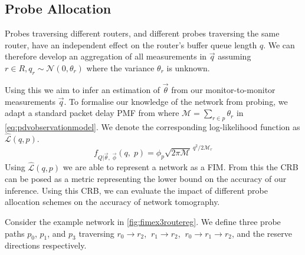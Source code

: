 \subsection{Probe Allocation}
\label{ssec:Mprobeallocation}
Probes traversing different routers, and different probes traversing the same router, have an independent effect on the router's buffer queue length $q$. We can therefore develop an aggregation of all measurements in $\vec{q}$ assuming $r\in R, q_r \sim \mathcal{N}(0, \theta_r)$ where the variance $\theta_r$ is unknown.\par
Using this we aim to infer an estimation of $\vec{\theta}$ from our monitor-to-monitor measurements $\vec{q}$. To formalise our knowledge of the network from probing, we adapt a standard packet delay PMF from \cite{he_network_2021} where $\mathcal{M} = \sum_{r\in p}\theta_r$ in \cref{eq:pdvobservationmodel}. We denote the corresponding log-likelihood function as $\widehat{\mathcal{L}}(q, p)$.
\begin{equation}
\label{eq:pdvobservationmodel}
    f_{Q|\vec{\theta},\; \vec{\phi}}(q,\;p) = \phi_p \sqrt{2\pi\mathcal{M}}^{\ q^2/{2\mathcal{M}_r}}
\end{equation}
Using $\widehat{\mathcal{L}}(q, p)$ we are able to represent a network as a FIM. From this the CRB can be posed as a metric representing the lower bound on the accuracy of our inference. Using this CRB, we can evaluate the impact of different probe allocation schemes on the accuracy of network tomography.\par
Consider the example network in \cref{fig:fimex3routereg}. We define three probe paths $p_0$, $p_1$, and $p_3$ traversing $r_0\rightarrow r_2$, $\ r_1\rightarrow r_2$, $\ r_0\rightarrow r_1\rightarrow r_2$, and the reserve directions respectively.
